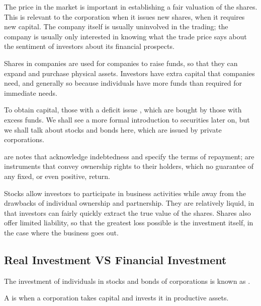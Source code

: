 \documentclass[notoc,notitlepage]{tufte-book}
\begin{document}
The price in the market is important
in establishing a fair valuation of the shares.
This is relevant to the corporation when it issues new shares,
when it requires new capital.
The company itself is usually uninvolved in the trading;
the company is usually only interested in knowing what the trade price
says about the sentiment of investors about its financial prospects.

Shares in companies are used for companies to raise funds,
so that they can expand and purchase physical assets.
Investors have extra capital that companies need, and generally so
because individuals have more funds than required for immediate needs.

To obtain capital, those with a deficit issue ,
which are bought by those with excess funds.
We shall see a more formal introduction to securities later on,
but we shall talk about stocks and bonds here, which are issued by
private corporations.

 are notes that acknowledge indebtedness and specify
the terms of repayment;  are instruments that convey
ownership rights to their holders,
which no guarantee of any fixed, or even positive, return.

Stocks allow investors to participate in business activities
while away from the drawbacks of individual ownership and partnership.
They are relatively liquid, in that investors can fairly quickly
extract the true value of the shares.
Shares also offer limited liability, so that the greatest loss possible
is the investment itself, in the case where the business goes out.

\subsection{Real Investment VS Financial Investment}%
\label{sub:real_investment_vs_financial_investment}

\begin{defn}\label{defn:financial_investment}
  The investment of individuals in stocks and bonds of corporations
  is known as .
\end{defn}

\begin{defn}\label{defn:real_investment}
  A is when a corporation takes capital
  and invests it in productive assets.
\end{defn}
\end{document}
